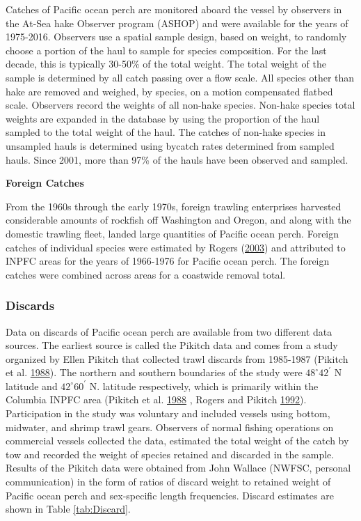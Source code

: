 \documentclass[12pt,]{article}
\begin{document}
Catches of Pacific ocean perch are monitored aboard the vessel by
observers in the At-Sea hake Observer program (ASHOP) and were available
for the years of 1975-2016. Observers use a spatial sample design, based
on weight, to randomly choose a portion of the haul to sample for
species composition. For the last decade, this is typically 30-50\% of
the total weight. The total weight of the sample is determined by all
catch passing over a flow scale. All species other than hake are removed
and weighed, by species, on a motion compensated flatbed scale.
Observers record the weights of all non-hake species. Non-hake species
total weights are expanded in the database by using the proportion of
the haul sampled to the total weight of the haul. The catches of
non-hake species in unsampled hauls is determined using bycatch rates
determined from sampled hauls. Since 2001, more than 97\% of the hauls
have been observed and sampled.

\textbf{Foreign Catches}

From the 1960s through the early 1970s, foreign trawling enterprises
harvested considerable amounts of rockfish off Washington and Oregon,
and along with the domestic trawling fleet, landed large quantities of
Pacific ocean perch. Foreign catches of individual species were
estimated by Rogers (\protect\hyperlink{ref-rogers_species_2003}{2003})
and attributed to INPFC areas for the years of 1966-1976 for Pacific
ocean perch. The foreign catches were combined across areas for a
coastwide removal total.

\subsubsection{Discards}\label{discards}

Data on discards of Pacific ocean perch are available from two different
data sources. The earliest source is called the Pikitch data and comes
from a study organized by Ellen Pikitch that collected trawl discards
from 1985-1987 (Pikitch et al.
\protect\hyperlink{ref-pikitch_evaluation_1988}{1988}). The northern and
southern boundaries of the study were \(48^\circ 42^\prime\) N latitude
and \(42^\circ 60^\prime\) N. latitude respectively, which is primarily
within the Columbia INPFC area (Pikitch et al.
\protect\hyperlink{ref-pikitch_evaluation_1988}{1988} , Rogers and
Pikitch \protect\hyperlink{ref-rogers_numerical_1992}{1992}).
Participation in the study was voluntary and included vessels using
bottom, midwater, and shrimp trawl gears. Observers of normal fishing
operations on commercial vessels collected the data, estimated the total
weight of the catch by tow and recorded the weight of species retained
and discarded in the sample. Results of the Pikitch data were obtained
from John Wallace (NWFSC, personal communication) in the form of ratios
of discard weight to retained weight of Pacific ocean perch and
sex-specific length frequencies. Discard estimates are shown in Table
\ref{tab:Discard}.
\end{document}
